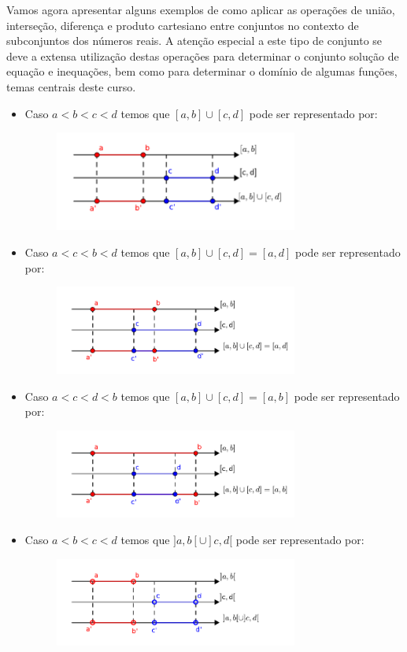 Vamos agora apresentar alguns exemplos de como aplicar as operações de união, interseção, diferença e produto cartesiano entre conjuntos no contexto de subconjuntos dos números reais. A atenção especial a este tipo de conjunto se deve a extensa utilização destas operações para determinar o conjunto solução de equação e inequações, bem como para determinar o domínio de algumas funções, temas centrais deste curso.

\begin{itemize}
 \item Caso $a< b< c< d$ temos que $[a, b] \cup [c, d]$ pode ser representado por:
  \begin{figure}[H]
 \centering
 \includegraphics[width=8cm]{./cap_conjnum/figs/uniaoabcd}
 \end{figure}

 \item Caso $a< c< b< d$ temos que $[a, b] \cup [c, d]= [a, d]$ pode ser representado por:
  \begin{figure}[H]
 \centering
 \includegraphics[width=8cm]{./cap_conjnum/figs/uniaoacbd}
 \end{figure}

  \item Caso $a< c< d< b$ temos que $[a, b] \cup [c, d]= [a, b]$ pode ser representado por:
  \begin{figure}[H]
 \centering
 \includegraphics[width=8cm]{./cap_conjnum/figs/uniaoacdb}
 \end{figure}

 \item Caso $a< b< c< d$ temos que $]a, b[ \cup ]c, d[$ pode ser representado por:
  \begin{figure}[H]
 \centering
 \includegraphics[width=8cm]{./cap_conjnum/figs/uniao-a-b-c-d}
 \end{figure}


\end{itemize}

